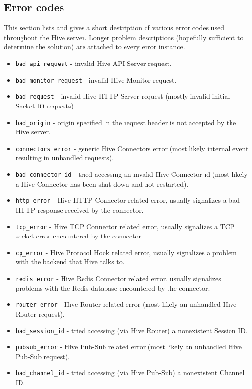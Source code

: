 \documentclass[a4paper]{article}
\begin{document}
\subsection{Error codes}
\label{sec-5-3}

This section lists and gives a short destription of various error codes used throughout the Hive server. Longer problem descriptions (hopefully sufficient to determine the solution) are attached to every error instance.


\begin{itemize}
\item \texttt{bad\_api\_request} - invalid Hive API Server request.
\item \texttt{bad\_monitor\_request} - invalid Hive Monitor request.
\item \texttt{bad\_request} - invalid Hive HTTP Server request (mostly invalid initial Socket.IO requests).
\item \texttt{bad\_origin} - origin specified in the request header is not accepted by the Hive server.
\item \texttt{connectors\_error} - generic Hive Connectors error (most likely internal event resulting in unhandled requests).
\item \texttt{bad\_connector\_id} - tried accessing an invalid Hive Connector id (most likely a Hive Connector has been shut down and not restarted).
\item \texttt{http\_error} - Hive HTTP Connector related error, usually signalizes a bad HTTP response received by the connector.
\item \texttt{tcp\_error} - Hive TCP Connector related error, usually signalizes a TCP socket error encountered by the connector.
\item \texttt{cp\_error} - Hive Protocol Hook related error, usually signalizes a problem with the backend that Hive talks to.
\item \texttt{redis\_error} - Hive Redis Connector related error, usually signalizes problems with the Redis database encountered by the connector.
\item \texttt{router\_error} - Hive Router related error (most likely an unhandled Hive Router request).
\item \texttt{bad\_session\_id} - tried accessing (via Hive Router) a nonexistent Session ID.
\item \texttt{pubsub\_error} - Hive Pub-Sub related error (most likely an unhandled Hive Pub-Sub request).
\item \texttt{bad\_channel\_id} - tried accessing (via Hive Pub-Sub) a nonexistent Channel ID.

\end{itemize}
\end{document}
